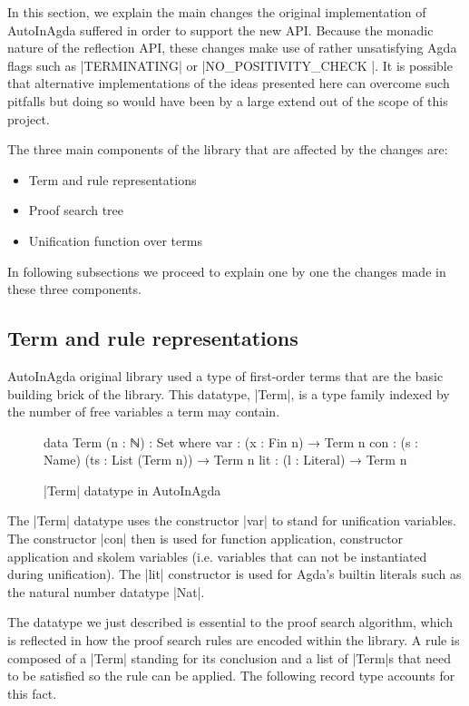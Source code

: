 \documentclass[a4paper]{article}
\begin{document}
In this section, we explain the main changes the original implementation of
AutoInAgda suffered in order to support the new API. Because the monadic nature
of the reflection API, these changes make use of rather unsatisfying Agda flags
such as |TERMINATING| or |NO_POSITIVITY_CHECK |. It is possible that alternative
implementations of the ideas presented here can overcome such pitfalls but doing
so would have been by a large extend out of the scope of this project.

The three main components of the library that are affected by the changes are:

\begin{itemize}
    \item Term and rule representations
    \item Proof search tree
    \item Unification function over terms
\end{itemize}

In following subsections we proceed to explain one by one the changes
made in these three components.

\subsection{Term and rule representations}

AutoInAgda original library used a type of first-order terms that are the
basic building brick of the library. This datatype, |Term|, is a type family
indexed by the number of free variables a term may contain.

\begin{figure}[h]
\small
\label{fig:term:AutoInAgda}
\begin{code}
  data Term (n : ℕ) : Set where
      var : (x : Fin n) → Term n
      con : (s : Name) (ts : List (Term n)) → Term n
      lit : (l : Literal) → Term n
\end{code}
  \caption{|Term| datatype in AutoInAgda}
\end{figure}

The |Term| datatype uses the constructor |var| to stand for unification
variables. The constructor |con| then is used for function application,
constructor application and skolem variables (i.e. variables that can not be
instantiated during unification). The |lit| constructor is used for Agda's
builtin literals such as the natural number datatype |Nat|.

The datatype we just described is essential to the proof search algorithm, which
is reflected in how the proof search rules are encoded within the library. A
rule is composed of a |Term| standing for its conclusion and a list of |Term|s
that need to be satisfied so the rule can be applied. The following record type
accounts for this fact.
\end{document}
